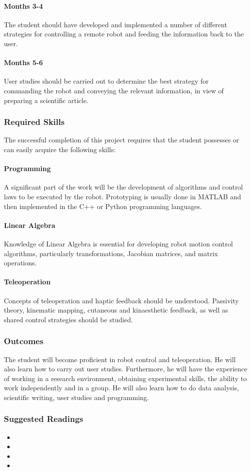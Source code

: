 \paragraph{Months 3-4}
The student should have developed and implemented a number of different strategies for controlling a remote robot and feeding the information back to the user.
\paragraph{Months 5-6}
User studies should be carried out to determine the best strategy for commanding the robot and conveying the relevant information, in view of preparing a scientific article.

\subsubsection{Required Skills}
The successful completion of this project requires that the student possesses or can easily acquire the following skills: 
\paragraph{Programming} A significant part of the work will be the development of algorithms and control laws to be executed by the robot. Prototyping is usually done in MATLAB and then implemented in the C++ or Python programming languages.
\paragraph{Linear Algebra} Knowledge of Linear Algebra is essential for developing robot motion control algorithms, particularly  transformations, Jacobian matrices, and matrix operations.
\paragraph{Teleoperation}
Concepts of teleoperation and haptic feedback should be understood.
Passivity theory, kinematic mapping, cutaneous and kinaesthetic feedback, as well as shared control strategies should be studied.

\subsubsection{Outcomes}
The student will become proficient in robot control and teleoperation.
He will also learn how to carry out user studies.
Furthermore, he will have the experience of working in a research environment, obtaining experimental skills, the ability to work independently and in a group. He will also learn how to do data analysis, scientific writing, user studies and programming.
\subsubsection{Suggested Readings}
\begin{itemize}
	\item	{}
	\item  {}
	\item {}
	\item {}
\end{itemize}


